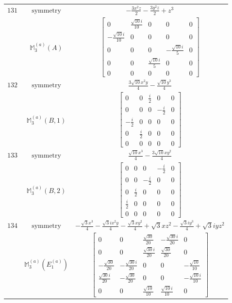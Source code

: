 \documentclass[fleqn,8pt,landscape]{jsarticle}
\begin{document}
\begin{longtable}{ccc}
$ 131 $ & $ \text{symmetry} $ & $ - \frac{3 x^{2} z}{2} - \frac{3 y^{2} z}{2} + z^{3} $ \\
$  $ & $ \mathbb{M}_{3}^{(a)}(A) $ & $ \begin{bmatrix} 0 & \frac{\sqrt{10} i}{10} & 0 & 0 & 0 \\ - \frac{\sqrt{10} i}{10} & 0 & 0 & 0 & 0 \\ 0 & 0 & 0 & - \frac{\sqrt{10} i}{5} & 0 \\ 0 & 0 & \frac{\sqrt{10} i}{5} & 0 & 0 \\ 0 & 0 & 0 & 0 & 0 \end{bmatrix} $ \\ \hline
$ 132 $ & $ \text{symmetry} $ & $ \frac{3 \sqrt{10} x^{2} y}{4} - \frac{\sqrt{10} y^{3}}{4} $ \\
$  $ & $ \mathbb{M}_{3}^{(a)}(B,1) $ & $ \begin{bmatrix} 0 & 0 & \frac{i}{2} & 0 & 0 \\ 0 & 0 & 0 & - \frac{i}{2} & 0 \\ - \frac{i}{2} & 0 & 0 & 0 & 0 \\ 0 & \frac{i}{2} & 0 & 0 & 0 \\ 0 & 0 & 0 & 0 & 0 \end{bmatrix} $ \\ \hline
$ 133 $ & $ \text{symmetry} $ & $ \frac{\sqrt{10} x^{3}}{4} - \frac{3 \sqrt{10} x y^{2}}{4} $ \\
$  $ & $ \mathbb{M}_{3}^{(a)}(B,2) $ & $ \begin{bmatrix} 0 & 0 & 0 & - \frac{i}{2} & 0 \\ 0 & 0 & - \frac{i}{2} & 0 & 0 \\ 0 & \frac{i}{2} & 0 & 0 & 0 \\ \frac{i}{2} & 0 & 0 & 0 & 0 \\ 0 & 0 & 0 & 0 & 0 \end{bmatrix} $ \\ \hline
$ 134 $ & $ \text{symmetry} $ & $ - \frac{\sqrt{3} x^{3}}{4} - \frac{\sqrt{3} i x^{2} y}{4} - \frac{\sqrt{3} x y^{2}}{4} + \sqrt{3} x z^{2} - \frac{\sqrt{3} i y^{3}}{4} + \sqrt{3} i y z^{2} $ \\
$  $ & $ \mathbb{M}_{3}^{(a)}(E_{1}^{(a)}) $ & $ \begin{bmatrix} 0 & 0 & \frac{\sqrt{30}}{20} & - \frac{\sqrt{30} i}{20} & 0 \\ 0 & 0 & \frac{\sqrt{30} i}{20} & \frac{\sqrt{30}}{20} & 0 \\ - \frac{\sqrt{30}}{20} & - \frac{\sqrt{30} i}{20} & 0 & 0 & - \frac{\sqrt{10}}{10} \\ \frac{\sqrt{30} i}{20} & - \frac{\sqrt{30}}{20} & 0 & 0 & - \frac{\sqrt{10} i}{10} \\ 0 & 0 & \frac{\sqrt{10}}{10} & \frac{\sqrt{10} i}{10} & 0 \end{bmatrix} $ \\ \hline

\end{longtable}
\end{document}

